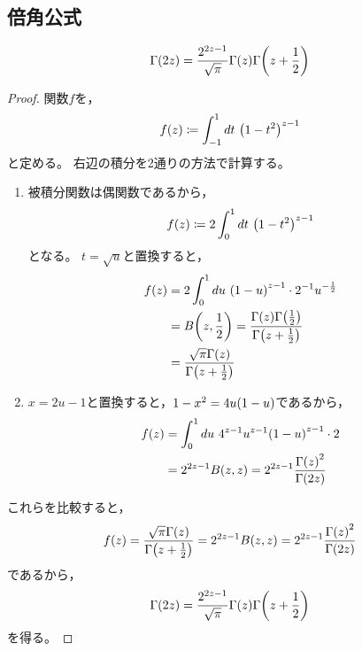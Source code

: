 \documentclass[a4paper,draft]{ltjsarticle}
\begin{document}
\subsection{倍角公式}
\begin{thm}[Legendreの倍角公式]\label{thm-Gamma-Legendreの倍角公式}
    \begin{equation}
        \fun{\Gamma}{2z}=\dfrac{2^{2z-1}}{\sqrt{\pi}}\fun{\Gamma}{z}\fun{\Gamma}{z+\dfrac{1}{2}}
    \end{equation}
    \begin{proof}
        関数$f$を，
        \begin{equation}
            \fun{f}{z}\coloneqq \int_{-1}^1 dt\ \pare{1-t^2}^{z-1}
        \end{equation}
        と定める。
        右辺の積分を2通りの方法で計算する。
        \begin{enumerate}[label=(\roman*)]
            \item 被積分関数は偶関数であるから，
            \begin{equation}
                \fun{f}{z}\coloneqq 2\int_{0}^1 dt\ \pare{1-t^2}^{z-1}
            \end{equation}
            となる。
            $t=\sqrt{u}$と置換すると，
            \begin{align}
                \fun{f}{z}&=2\int_0^1 du\ \pare{1-u}^{z-1}\cdot 2^{-1}u^{-\frac{1}{2}}
                \\
                &=\fun{B}{z,\frac{1}{2}}=\dfrac{\fun{\Gamma}{z}\fun{\Gamma}{\frac{1}{2}}}{\fun{\Gamma}{z+\frac{1}{2}}}
                \\
                &=\dfrac{\sqrt{\pi}\fun{\Gamma}{z}}{\fun{\Gamma}{z+\frac{1}{2}}}
            \end{align}

            \item $x=2u-1$と置換すると，$1-x^2=4u\pare{1-u}$であるから，
            \begin{align}
                \fun{f}{z}&=\int_0^1 du\ 4^{z-1}u^{z-1}\pare{1-u}^{z-1}\cdot 2
                \\
                &=2^{2z-1}\fun{B}{z,z}=2^{2z-1}\dfrac{\fun{\Gamma}{z}^2}{\fun{\Gamma}{2z}}
            \end{align}
        \end{enumerate}
        これらを比較すると，
        \begin{equation}
            \fun{f}{z}=\dfrac{\sqrt{\pi}\fun{\Gamma}{z}}{\fun{\Gamma}{z+\frac{1}{2}}}
            =2^{2z-1}\fun{B}{z,z}=2^{2z-1}\dfrac{\fun{\Gamma}{z}^2}{\fun{\Gamma}{2z}}
        \end{equation}
        であるから，
        \begin{equation}
            \fun{\Gamma}{2z}=\dfrac{2^{2z-1}}{\sqrt{\pi}}\fun{\Gamma}{z}\fun{\Gamma}{z+\dfrac{1}{2}}
        \end{equation}
        を得る。
    \end{proof}


\end{thm}
\end{document}

